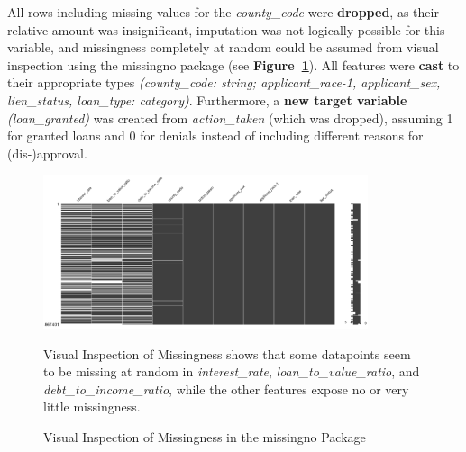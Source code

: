 All rows including missing values for the \textit{county\_code} were \textbf{dropped}, as their relative amount was insignificant, imputation was not logically possible for this variable, and missingness completely at random could be assumed from visual inspection using the missingno package (see \textbf{Figure~\ref{fig:CH03_Missingno_Completeness}}). 
All features were \textbf{cast} to their appropriate types \textit{(county\_code: string; applicant\_race-1, applicant\_sex, lien\_status, loan\_type: category)}. Furthermore, a \textbf{new target variable} \textit{(loan\_granted)} was created from \textit{action\_taken} (which was dropped), assuming 1 for granted loans and 0 for denials instead of including different reasons for (dis-)approval.

\begin{figure}[h]
    \centering
    \includegraphics[width=0.85\textwidth]{images/CH03_Missingno_Completeness.png}
    \caption{Visual Inspection of Missingness in the missingno Package}
    \medskip
    \small
    Visual Inspection of Missingness shows that some datapoints seem to be missing at random in \textit{interest\_rate}, \textit{loan\_to\_value\_ratio}, and \textit{debt\_to\_income\_ratio}, while the other features expose no or very little missingness.
    \label{fig:CH03_Missingno_Completeness}
\end{figure}

